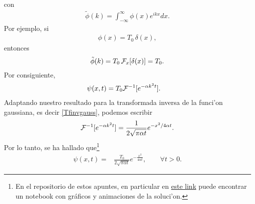 con
\begin{align}
\tilde{\phi}(k)=\int_{-\infty}^{\infty}\phi(x)e^{ikx}dx.
\end{align}
Por ejemplo, si
\begin{align}
\phi(x)=T_{0}\,\delta(x),
\end{align}
entonces
\begin{align}
\tilde{\phi}(k)=T_{0}\,{\cal F}_{x}[\delta(x)]=T_{0}.
\end{align}
Por consiguiente,
\begin{align}
\psi(x,t) &= T_{0}{\cal F}^{-1}[e^{-\alpha k^2 t}].
\end{align}
Adaptando nuestro resultado para la transformada inversa de la funci'on gaussiana, es decir \eqref{Tfinvgauss}, podemos escribir
\begin{align}
{\cal F}^{-1}[e^{-\alpha k^2 t}] = \frac{1}{2\sqrt{\pi\alpha t}}e^{-x^2/4\alpha t}.
\end{align}
Por lo tanto, se ha hallado que\footnote{En el repositorio de estos apuntes, en particular en \href{https://github.com/gfrubi/FM2/blob/master/Notebooks/Ejemplo-Difusion-Calor-1D.ipynb}{este link} puede encontrar un notebook con gráficos y animaciones de la soluci'on.}
\begin{align}
\psi(x,t)=&\frac{T_{0}}{2\sqrt{\pi \alpha t}}e^{-\frac{x^2}{4 \alpha t}},\qquad \forall t>0.
\end{align}
